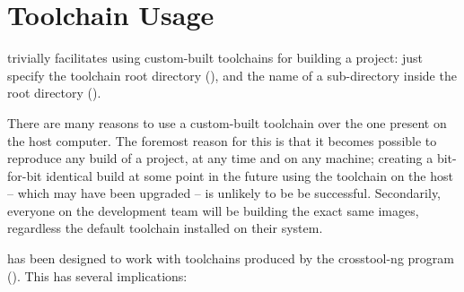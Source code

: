 %
%
%
%
\chapter{Toolchain Usage}\label{chap:toolchain-usage}

\lmsbw trivially facilitates using custom-built toolchains for
building a project: just specify the toolchain root directory
(), and the name of a sub-directory
inside the root directory ().

There are many reasons to use a custom-built toolchain over the one
present on the host computer.  The foremost reason for this is that it
becomes possible to reproduce any build of a project, at any time and
on any machine; creating a bit-for-bit identical build at some point
in the future using the toolchain on the host -- which may have been
upgraded -- is unlikely to be be successful.  Secondarily, everyone on
the development team will be building the exact same images,
regardless the default toolchain installed on their system.

\lmsbw has been designed to work with toolchains produced by the
crosstool-ng program ().  This has
several implications:

